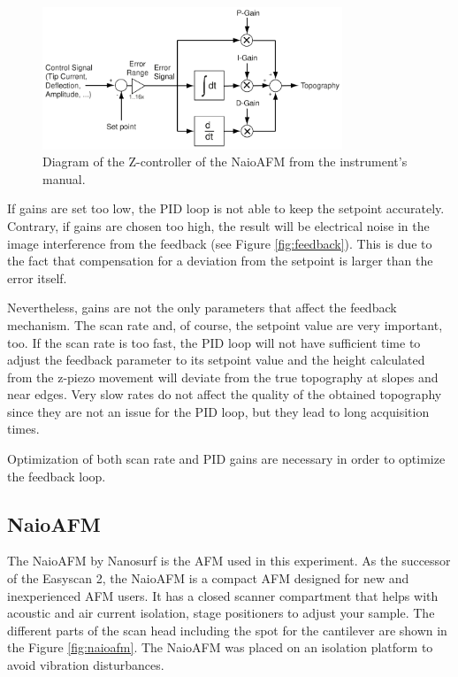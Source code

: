 \documentclass[11pt,a4paper]{article}
\begin{document}
\begin{figure}[hbt]
\centering
\includegraphics[width=0.8\textwidth]{Feedback_NaioAFM}
\caption{Diagram of the Z-controller of the NaioAFM from the instrument's manual.}
\label{fig:feedback_z-controller}
\end{figure}

If gains are set too low, the PID loop is not able to keep the setpoint accurately. Contrary, if gains are chosen too high, the result will be electrical noise in the image interference from the feedback (see Figure \ref{fig:feedback}). This is due to the fact that compensation for a deviation from the setpoint is larger than the error itself.

Nevertheless, gains are not the only parameters that affect the feedback mechanism. The scan rate and, of course, the setpoint value are very important, too. If the scan rate is too fast, the PID loop will not have sufficient time to adjust the feedback parameter to its setpoint value and the height calculated from the z-piezo movement will deviate from the true topography at slopes and near edges. Very slow rates do not affect the quality of the obtained topography since they are not an issue for the PID loop, but they lead to long acquisition times.

Optimization of both scan rate and PID gains are necessary in order to optimize the feedback loop.

\subsection{NaioAFM}

The NaioAFM by Nanosurf \cite{NaioAFM} is the AFM used in this experiment. As the successor of the Easyscan 2, the NaioAFM is a compact AFM designed for new and inexperienced AFM users. It has a closed scanner compartment that helps with acoustic and air current isolation, stage positioners to adjust your sample. The different parts of the scan head including the spot for the cantilever are shown in the Figure \ref{fig:naioafm}. The NaioAFM was placed on an isolation platform to avoid vibration disturbances.
\end{document}
